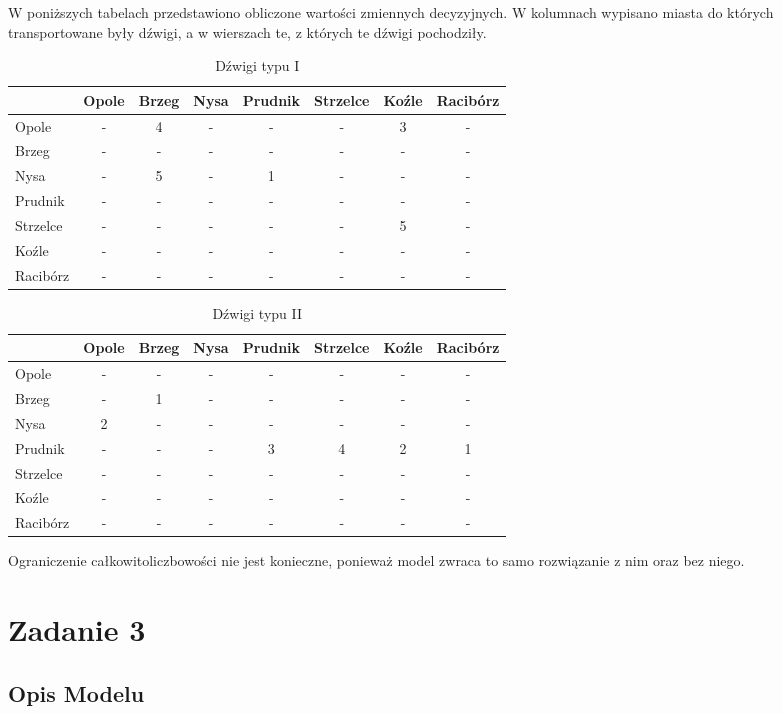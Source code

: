 \documentclass{article}
\begin{document}
W poniższych tabelach przedstawiono obliczone wartości zmiennych decyzyjnych. W kolumnach wypisano miasta do których transportowane były dźwigi, a w wierszach te, z których te dźwigi pochodziły.

\begin{table}[H]
\centering
\begin{tabular}{l|c c c c c c c }
 & Opole & Brzeg & Nysa & Prudnik & Strzelce & Koźle & Racibórz\\\hline
Opole & - & 4 & - & - & - & 3 & -\\\hline
Brzeg & - & - & - & - & - & - & -\\\hline
Nysa & - & 5 & - & 1 & - & - & -\\\hline
Prudnik & - & - & - & - & - & - & -\\\hline
Strzelce & - & - & - & - & - & 5 & -\\\hline
Koźle & - & - & - & - & - & - & -\\\hline
Racibórz & - & - & - & - & - & - & -\\\hline
\end{tabular}
\caption{Dźwigi typu I}
\end{table}

\begin{table}[H]
\centering
\begin{tabular}{l|c c c c c c c}
 & Opole & Brzeg & Nysa & Prudnik & Strzelce & Koźle & Racibórz\\\hline
Opole & - & - & - & - & - & - & -\\\hline
Brzeg & - & 1 & - & - & - & - & -\\\hline
Nysa & 2 & - & - & - & - & - & -\\\hline
Prudnik & - & - & - & 3 & 4 & 2 & 1\\\hline
Strzelce & - & - & - & - & - & - & -\\\hline
Koźle & - & - & - & - & - & - & -\\\hline
Racibórz & - & - & - & - & - & - & -\\\hline
\end{tabular}
\caption{Dźwigi typu II}
\end{table}

Ograniczenie całkowitoliczbowości nie jest konieczne, ponieważ model zwraca to samo rozwiązanie z nim oraz bez niego.

\section{Zadanie 3}
\subsection{Opis Modelu}
\end{document}
